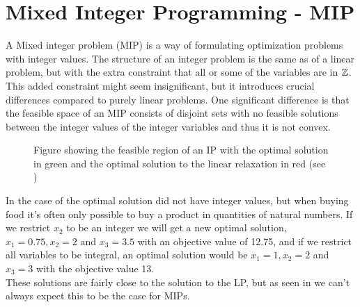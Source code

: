 \section{Mixed Integer Programming - MIP}
A Mixed integer problem (MIP) is a way of formulating optimization problems with integer values. The structure of an integer problem is the same as of a linear problem, but with the extra constraint that all or some of the variables are in $\mathbb{Z}$. This added constraint might seem insignificant, but it introduces crucial differences compared to purely linear problems. One significant difference is that the feasible space of an MIP consists of disjoint sets with no feasible solutions between the integer values of the integer variables and thus it is not convex.
\begin{figure}[H]\label{IP figure}
\centering
{}
\caption{Figure showing the feasible region of an IP with the optimal solution in green and the optimal solution to the linear relaxation in red (see )}
\end{figure}
\begin{example}
In the case of  the optimal solution did not have integer values, but when buying food it's often only possible to buy a product in quantities of natural numbers. If we restrict $x_2$ to be an integer we will get a new optimal solution, $x_1=0.75, x_2=2$ and $x_3= 3.5$ with an objective value of 12.75, and if we restrict all variables to be integral, an optimal solution would be $x_1=1, x_2=2$ and $x_3= 3$ with the objective value 13.\\
These solutions are fairly close to the solution to the LP, but as seen in  we can't always expect this to be the case for MIPs.
\end{example}
